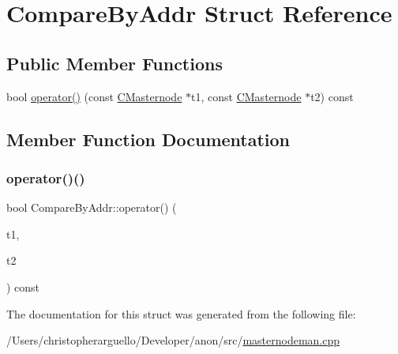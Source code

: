 \hypertarget{struct_compare_by_addr}{}\section{Compare\+By\+Addr Struct Reference}
\label{struct_compare_by_addr}
\subsection*{Public Member Functions}
\begin{DoxyCompactItemize}
\item 
bool \mbox{\hyperlink{struct_compare_by_addr_aabb1eb0e32f4e95336e091807dc17822}{operator()}} (const \mbox{\hyperlink{class_c_masternode}{C\+Masternode}} $\ast$t1, const \mbox{\hyperlink{class_c_masternode}{C\+Masternode}} $\ast$t2) const
\end{DoxyCompactItemize}


\subsection{Member Function Documentation}
\mbox{\label{struct_compare_by_addr_aabb1eb0e32f4e95336e091807dc17822}} 
\subsubsection{\texorpdfstring{operator()()}{operator()()}}
{\footnotesize\ttfamily bool Compare\+By\+Addr\+::operator() (\begin{DoxyParamCaption}\item[{const \mbox{\hyperlink{class_c_masternode}{C\+Masternode}} $\ast$}]{t1,  }\item[{const \mbox{\hyperlink{class_c_masternode}{C\+Masternode}} $\ast$}]{t2 }\end{DoxyParamCaption}) const\hspace{0.3cm}{\ttfamily [inline]}}



The documentation for this struct was generated from the following file\+:\begin{DoxyCompactItemize}
\item 
/\+Users/christopherarguello/\+Developer/anon/src/\mbox{\hyperlink{masternodeman_8cpp}{masternodeman.\+cpp}}\end{DoxyCompactItemize}
